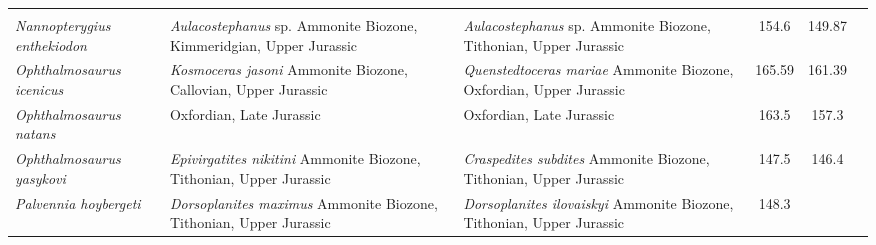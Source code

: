 \begin{longtabu}{>{\itshape}lXXSSl}
                                                             &
                                                             \cite{Maxwell2016PP} \\                    
	Nannopterygius enthekiodon                           &
        \emph{Aulacostephanus} sp. Ammonite Biozone, Kimmeridgian, Upper
        Jurassic                                                          &
        \emph{Aulacostephanus} sp. Ammonite Biozone, Tithonian, Upper Jurassic
                                                                          &
        154.6                    & 149.87                   & \cite{Moon2018MPS} \\                       
	Ophthalmosaurus icenicus                             & \emph{Kosmoceras
        jasoni} Ammonite Biozone, Callovian, Upper Jurassic
                                                             &
            \emph{Quenstedtoceras mariae} Ammonite Biozone, Oxfordian, Upper
            Jurassic                                                          &
            165.59                   & 161.39                   &
            \cite{Moon2016MPS} \\                       
	Ophthalmosaurus natans                               & Oxfordian, Late
        Jurassic
                                                             & Oxfordian, Late
        Jurassic
                                                             & 163.5
                                                             & 157.3
                                                             &
                                                             \cite{Gilmore1905MCM} \\                    
	Ophthalmosaurus yasykovi                             &
        \emph{Epivirgatites nikitini} Ammonite Biozone, Tithonian, Upper
        Jurassic                                                          &
        \emph{Craspedites subdites} Ammonite Biozone, Tithonian, Upper Jurassic
                                                                          &
        147.5                    & 146.4                    & \cite{Efimov1999PZ} \\                     
	Palvennia hoybergeti                                 &
        \emph{Dorsoplanites maximus} Ammonite Biozone, Tithonian, Upper Jurassic
                                                             &
        \emph{Dorsoplanites ilovaiskyi} Ammonite Biozone, Tithonian, Upper
        Jurassic                                                        & 148.3

\end{longtabu}
